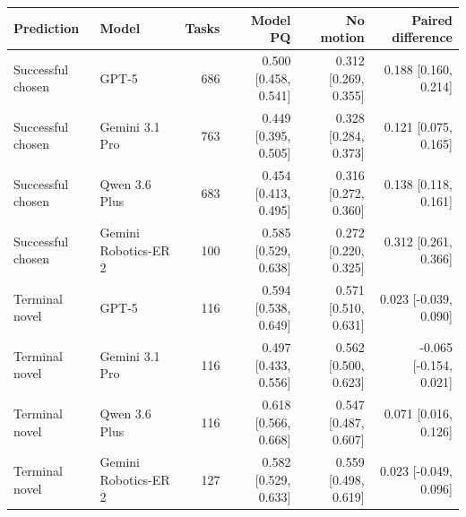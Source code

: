 \begin{tabular}{llrrrr}
\toprule
Prediction & Model & Tasks & Model PQ & No motion & Paired difference \\
\midrule
Successful chosen & GPT-5 & 686 & 0.500 [0.458, 0.541] & 0.312 [0.269, 0.355] & 0.188 [0.160, 0.214] \\
Successful chosen & Gemini 3.1 Pro & 763 & 0.449 [0.395, 0.505] & 0.328 [0.284, 0.373] & 0.121 [0.075, 0.165] \\
Successful chosen & Qwen 3.6 Plus & 683 & 0.454 [0.413, 0.495] & 0.316 [0.272, 0.360] & 0.138 [0.118, 0.161] \\
Successful chosen & Gemini Robotics-ER 2 & 100 & 0.585 [0.529, 0.638] & 0.272 [0.220, 0.325] & 0.312 [0.261, 0.366] \\
Terminal novel & GPT-5 & 116 & 0.594 [0.538, 0.649] & 0.571 [0.510, 0.631] & 0.023 [-0.039, 0.090] \\
Terminal novel & Gemini 3.1 Pro & 116 & 0.497 [0.433, 0.556] & 0.562 [0.500, 0.623] & -0.065 [-0.154, 0.021] \\
Terminal novel & Qwen 3.6 Plus & 116 & 0.618 [0.566, 0.668] & 0.547 [0.487, 0.607] & 0.071 [0.016, 0.126] \\
Terminal novel & Gemini Robotics-ER 2 & 127 & 0.582 [0.529, 0.633] & 0.559 [0.498, 0.619] & 0.023 [-0.049, 0.096] \\
\bottomrule
\end{tabular}
